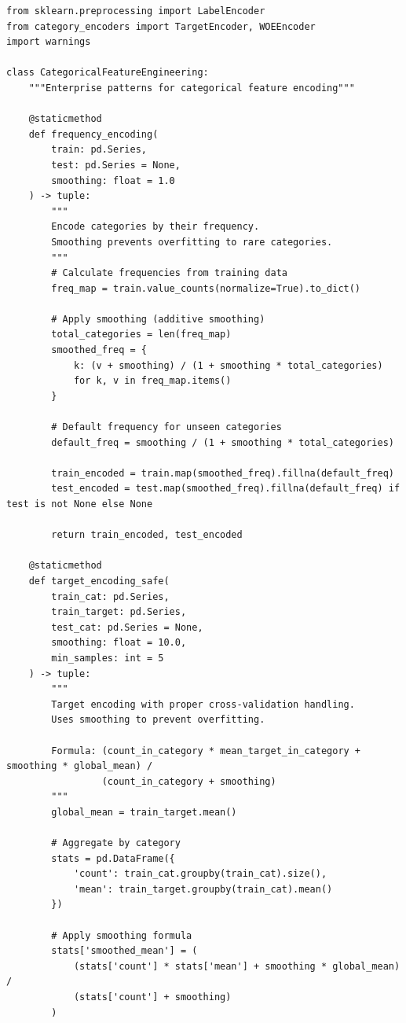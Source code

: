 \begin{lstlisting}[style=python, caption=Production-ready categorical feature encoding]
from sklearn.preprocessing import LabelEncoder
from category_encoders import TargetEncoder, WOEEncoder
import warnings

class CategoricalFeatureEngineering:
    """Enterprise patterns for categorical feature encoding"""

    @staticmethod
    def frequency_encoding(
        train: pd.Series,
        test: pd.Series = None,
        smoothing: float = 1.0
    ) -> tuple:
        """
        Encode categories by their frequency.
        Smoothing prevents overfitting to rare categories.
        """
        # Calculate frequencies from training data
        freq_map = train.value_counts(normalize=True).to_dict()

        # Apply smoothing (additive smoothing)
        total_categories = len(freq_map)
        smoothed_freq = {
            k: (v + smoothing) / (1 + smoothing * total_categories)
            for k, v in freq_map.items()
        }

        # Default frequency for unseen categories
        default_freq = smoothing / (1 + smoothing * total_categories)

        train_encoded = train.map(smoothed_freq).fillna(default_freq)
        test_encoded = test.map(smoothed_freq).fillna(default_freq) if test is not None else None

        return train_encoded, test_encoded

    @staticmethod
    def target_encoding_safe(
        train_cat: pd.Series,
        train_target: pd.Series,
        test_cat: pd.Series = None,
        smoothing: float = 10.0,
        min_samples: int = 5
    ) -> tuple:
        """
        Target encoding with proper cross-validation handling.
        Uses smoothing to prevent overfitting.

        Formula: (count_in_category * mean_target_in_category + smoothing * global_mean) /
                 (count_in_category + smoothing)
        """
        global_mean = train_target.mean()

        # Aggregate by category
        stats = pd.DataFrame({
            'count': train_cat.groupby(train_cat).size(),
            'mean': train_target.groupby(train_cat).mean()
        })

        # Apply smoothing formula
        stats['smoothed_mean'] = (
            (stats['count'] * stats['mean'] + smoothing * global_mean) /
            (stats['count'] + smoothing)
        )


\end{lstlisting}
